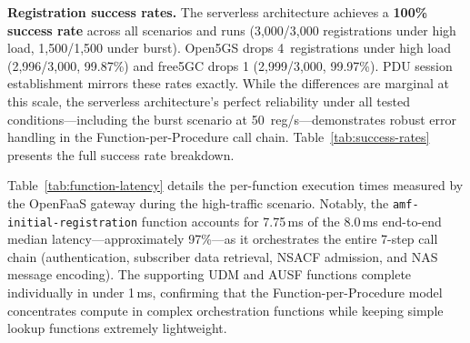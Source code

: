 \documentclass[conference]{IEEEtran}
\begin{document}
\textbf{Registration success rates.} The serverless architecture achieves a \textbf{100\% success rate} across all scenarios and runs (3{,}000/3{,}000 registrations under high load, 1{,}500/1{,}500 under burst). Open5GS drops 4~registrations under high load (2{,}996/3{,}000, 99.87\%) and free5GC drops 1 (2{,}999/3{,}000, 99.97\%). PDU session establishment mirrors these rates exactly. While the differences are marginal at this scale, the serverless architecture's perfect reliability under all tested conditions---including the burst scenario at 50~reg/s---demonstrates robust error handling in the Function-per-Procedure call chain. Table~\ref{tab:success-rates} presents the full success rate breakdown.

\begin{table}[t]
\centering
\caption{Registration \& PDU Session Success Rates (3-run totals)}
\label{tab:success-rates}
\footnotesize
{}
\end{table}

Table~\ref{tab:function-latency} details the per-function execution times measured by the OpenFaaS gateway during the high-traffic scenario. Notably, the \texttt{amf-initial-registration} function accounts for 7.75\,ms of the 8.0\,ms end-to-end median latency---approximately 97\%---as it orchestrates the entire 7-step call chain (authentication, subscriber data retrieval, NSACF admission, and NAS message encoding). The supporting UDM and AUSF functions complete individually in under 1\,ms, confirming that the Function-per-Procedure model concentrates compute in complex orchestration functions while keeping simple lookup functions extremely lightweight.
\end{document}
